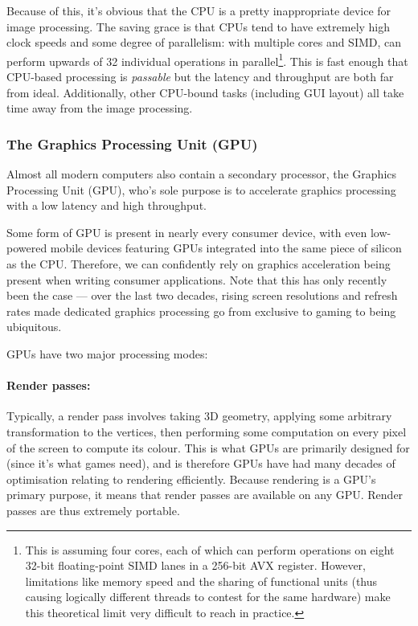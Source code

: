 \documentclass[12pt]{article}
\begin{document}
Because of this, it's obvious that the CPU is a pretty inappropriate device for image processing.
The saving grace is that CPUs tend to have extremely high clock speeds and some degree of
parallelism: with multiple cores and SIMD, can perform upwards of 32 individual operations in
parallel\footnote{This is assuming four cores, each of which can perform operations on eight 32-bit
floating-point SIMD lanes in a 256-bit AVX register.  However, limitations like memory speed and the
sharing of functional units (thus causing logically different threads to contest for the same
hardware) make this theoretical limit very difficult to reach in practice.}.  This is fast enough
that CPU-based processing is \emph{passable} but the latency and throughput are both far from ideal.
Additionally, other CPU-bound tasks (including GUI layout) all take time away from the image
processing.

\subsubsection{The Graphics Processing Unit (GPU)}

Almost all modern computers also contain a secondary processor, the Graphics Processing Unit (GPU),
who's sole purpose is to accelerate graphics processing with a low latency and high throughput.

Some form of GPU is present in nearly every consumer device, with even low-powered mobile devices
featuring GPUs integrated into the same piece of silicon as the CPU.  Therefore, we can confidently
rely on graphics acceleration being present when writing consumer applications.  Note that this has
only recently been the case --- over the last two decades, rising screen resolutions and refresh
rates made dedicated graphics processing go from exclusive to gaming to being ubiquitous.

GPUs have two major processing modes:

\paragraph{Render passes:} Typically, a render pass involves taking 3D geometry, applying some
arbitrary transformation to the vertices, then performing some computation on every pixel of the
screen to compute its colour.  This is what GPUs are primarily designed for (since it's what games
need), and is therefore GPUs have had many decades of optimisation relating to rendering
efficiently.  Because rendering is a GPU's primary purpose, it means that render passes are
available on any GPU.  Render passes are thus extremely portable.
\end{document}
